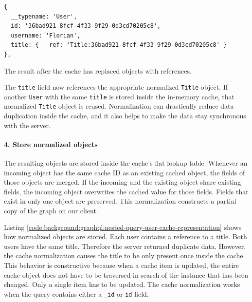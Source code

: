 \ifshowListings
\begin{listing}[H]
    \begin{verbatim}
{
  __typename: 'User',
  id: '36bad921-8fcf-4f33-9f29-0d3cd70205c8',
  username: 'Florian',
  title: { __ref: 'Title:36bad921-8fcf-4f33-9f29-0d3cd70205c8' }
},
    \end{verbatim}
    \caption{The result after the cache has replaced objects with references.}\label{code:background:graphql:nested-query-response-after-replacement}
\end{listing}
\fi

\noindent The \texttt{title} field now references the appropriate normalized \texttt{Title} object. If another \texttt{User} with the same \texttt{title} is stored inside the in-memory cache, that normalized \texttt{Title} object is reused. Normalization can drastically reduce data duplication inside the cache, and it also helps to make the data stay synchronous with the server.

\paragraph{4. Store normalized objects}\label{paragraph:background:graphql:apollo-server-client:data-normalization:store-normalized-objects}

The resulting objects are stored inside the cache's flat lookup table. Whenever an incoming object has the same cache ID as an existing cached object, the fields of those objects are merged. If the incoming and the existing object share existing fields, the incoming object overwrites the cached value for those fields. Fields that exist in only one object are preserved. This normalization constructs a partial copy of the graph on our client. \cite{misc:-:background:graphql:apollo-client-cache-overview}

\bigskip

\noindent Listing \ref{code:background:graphql:nested-query-user-cache-representation} shows how normalized objects are stored. Each user contains a reference to a title. Both users have the same title. Therefore the server returned duplicate data. However, the cache normalization causes the title to be only present once inside the cache. This behavior is constructive because when a cache item is updated, the entire cache object does not have to be traversed in search of the instance that has been changed. Only a single item has to be updated. The cache normalization works when the query contains either a \texttt{\_id} or \texttt{id} field.

